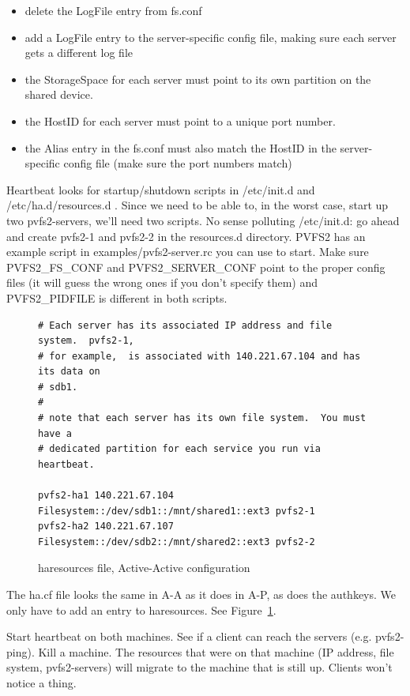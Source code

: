 \documentclass[11pt]{article}
\begin{document}
\begin{itemize}
	\item delete the LogFile entry from fs.conf
	\item add a LogFile entry to the server-specific config file, making
  	  sure each server gets a different log file
	\item the StorageSpace for each server must point to its own
 	  partition on the shared device.
	\item the HostID for each server must point to a unique port number.
	\item the Alias entry in the fs.conf must also match the HostID in
	  the server-specific config file (make sure the port numbers
	  match)
\end{itemize}

Heartbeat looks for startup/shutdown scripts in /etc/init.d and
/etc/ha.d/resources.d .  Since we need to be able to, in the worst case,
start up two pvfs2-servers, we'll need two scripts.  No sense
polluting /etc/init.d:  go ahead and create pvfs2-1 and pvfs2-2 in the
resources.d directory.  PVFS2 has an example script in
examples/pvfs2-server.rc you can use to start.  Make sure PVFS2\_FS\_CONF
and PVFS2\_SERVER\_CONF point to the proper config files (it will guess
the wrong ones if you don't specify them) and PVFS2\_PIDFILE is different
in both scripts.

\begin{figure}
\begin{verbatim}
# Each server has its associated IP address and file system.  pvfs2-1,
# for example,  is associated with 140.221.67.104 and has its data on
# sdb1.  
# 
# note that each server has its own file system.  You must have a
# dedicated partition for each service you run via heartbeat.

pvfs2-ha1 140.221.67.104 Filesystem::/dev/sdb1::/mnt/shared1::ext3 pvfs2-1
pvfs2-ha2 140.221.67.107 Filesystem::/dev/sdb2::/mnt/shared2::ext3 pvfs2-2
\end{verbatim}
\caption{haresources file, Active-Active configuration}
\label{fig:haresources-aa}
\end{figure}

The ha.cf file looks the same in A-A as it does in A-P, as does the
authkeys.  We only have to add an entry to haresources.  See
Figure~\ref{fig:haresources-aa}.


Start heartbeat on both machines.  See if a client can reach the servers
(e.g. pvfs2-ping).  Kill a machine.  The resources that were on that
machine (IP address, file system, pvfs2-servers) will migrate to the
machine that is still up.  Clients won't notice a thing.
\end{document}
